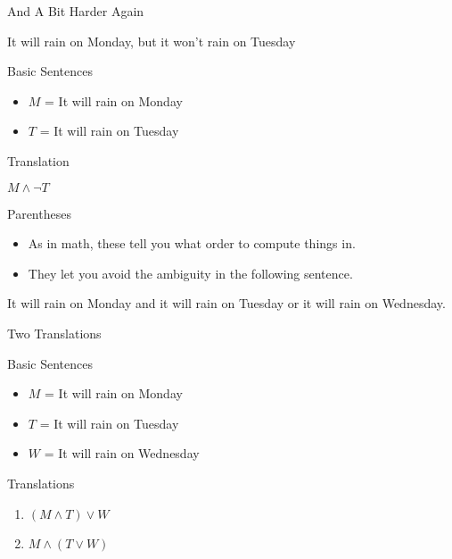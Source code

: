 \documentclass[
  ignorenonframetext,
]{beamer}
\providecommand{\tightlist}{%
  \setlength{\itemsep}{0pt}\setlength{\parskip}{0pt}}
\renewcommand{\,}{\text{, }}
\renewenvironment*{quote}	
	{\list{}{\rightmargin   \leftmargin} \item } 	
	{\endlist }
\begin{document}
\begin{frame}{And A Bit Harder Again}
\protect\hypertarget{and-a-bit-harder-again}{}

\begin{quote}
It will rain on Monday, but it won't rain on Tuesday
\end{quote}

Basic Sentences

\begin{itemize}
\tightlist
\item
  \(M\) = It will rain on Monday
\item
  \(T\) = It will rain on Tuesday
\end{itemize}

Translation

\begin{quote}
\(M \wedge \neg T\)
\end{quote}

\end{frame}

\begin{frame}{Parentheses}
\protect\hypertarget{parentheses}{}

\begin{itemize}
\tightlist
\item
  As in math, these tell you what order to compute things in.
\item
  They let you avoid the ambiguity in the following sentence.
\end{itemize}

\begin{quote}
It will rain on Monday and it will rain on Tuesday or it will rain on
Wednesday.
\end{quote}

\end{frame}

\begin{frame}{Two Translations}
\protect\hypertarget{two-translations}{}

Basic Sentences

\begin{itemize}
\tightlist
\item
  \(M\) = It will rain on Monday
\item
  \(T\) = It will rain on Tuesday
\item
  \(W\) = It will rain on Wednesday
\end{itemize}

Translations

\begin{enumerate}
\tightlist
\item
  \((M \wedge T) \vee W\)
\item
  \(M \wedge (T \vee W)\)
\end{enumerate}

\end{frame}
\end{document}
